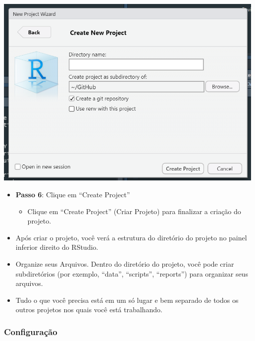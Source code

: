\documentclass[
  letterpaper,
  DIV=11,
  numbers=noendperiod]{scrartcl}
\providecommand{\tightlist}{%
  \setlength{\itemsep}{0pt}\setlength{\parskip}{0pt}}\usepackage{longtable,booktabs,array}
\begin{document}
\includegraphics[width=132mm,height=\textheight]{Figuras/proj_4.png}

\begin{itemize}
\item
  \textbf{Passo 6}: Clique em ``Create Project''

  \begin{itemize}
  \tightlist
  \item
    Clique em ``Create Project'' (Criar Projeto) para finalizar a
    criação do projeto.
  \end{itemize}
\item
  Após criar o projeto, você verá a estrutura do diretório do projeto no
  painel inferior direito do RStudio.
\item
  Organize seus Arquivos. Dentro do diretório do projeto, você pode
  criar subdiretórios (por exemplo, ``data'', ``scripts'', ``reports'')
  para organizar seus arquivos.
\item
  Tudo o que você precisa está em um só lugar e bem separado de todos os
  outros projetos nos quais você está trabalhando.
\end{itemize}

\subsubsection{Configuração}\label{configurauxe7uxe3o}
\end{document}

